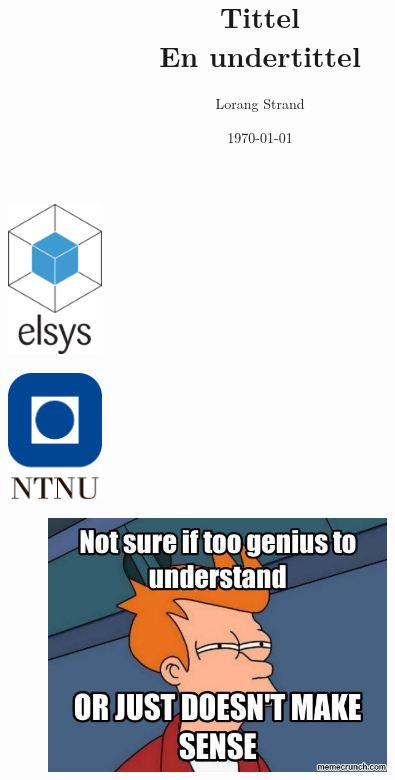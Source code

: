 
\title{%
    \textbf{Tittel} \\
    \large{En undertittel}}
\author{Lorang Strand}
\date{\today}   

\begin{minipage}[c]{0.20\textwidth}
    \includegraphics[width=2.5cm]{Bilder/elsys_2.png}  
\end{minipage}
\begin{minipage}[c]{0.60\textwidth}

    \maketitle

\end{minipage}
\begin{minipage}[c]{0.20\textwidth}
    \includegraphics[width=2.5cm]{Bilder/NTNU logo.png}  
\end{minipage}


\vfill
\begin{figure}[H]
    \centering
    \includegraphics[width=0.8\textwidth]{Bilder/Futurama_meme.jpg}
\end{figure}



